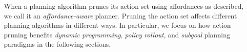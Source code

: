 \documentclass[]{article}
\begin{document}





When a planning algorithm prunes its action set using affordances as 
described, we call it an {\it affordance-aware} planner.
Pruning the action set affects
different planning algorithms in different ways. In particular, we
focus on how action pruning benefits {\em dynamic programming}, {\em
  policy rollout}, and {\em subgoal} planning paradigms in the
following sections.
\end{document}
